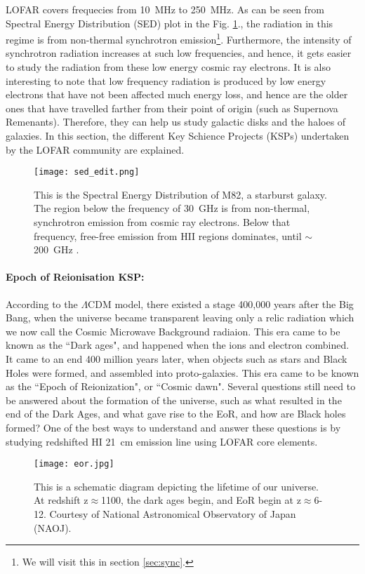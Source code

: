 \documentclass[../main/thesis_msc.tex]{subfiles}
\begin{document}
LOFAR covers frequecies from 10~MHz to 250~MHz. As can be seen from Spectral Energy Distribution (SED) plot in the Fig. \ref{sed}., the radiation in this regime is from non-thermal synchrotron emission\footnote{We will visit this in section \ref{sec:sync}.}. Furthermore, the intensity of synchrotron radiation increases at such low frequencies, and hence, it gets easier to study the radiation from these low energy cosmic ray electrons. It is also interesting to note that low frequency radiation is produced by low energy electrons that have not been affected much energy loss, and hence are the older ones that have travelled farther from their point of origin (such as Supernova Remenants). Therefore, they can help us study galactic disks and the haloes of galaxies. In this section, the different Key Schience Projects (KSPs) undertaken by the LOFAR community are explained.

\begin{figure}[h]
\centering
\texttt{[image: sed\_edit.png]}
\caption{This is the Spectral Energy Distribution of M82, a starburst galaxy. The region below the frequency of 30~GHz is from non-thermal, synchrotron emission from cosmic ray electrons. Below that frequency, free-free emission from HII regions dominates, until $\sim$200~GHz \citep{sed}.}
\label{sed}
\end{figure}

\paragraph{Epoch of Reionisation KSP:} According to the $\Lambda$CDM model, there existed a stage 400,000 years after the Big Bang, when the universe became transparent leaving only a relic radiation which we now call the Cosmic Microwave Background radiaion. This era came to be known as the ``Dark ages", and happened when the ions and electron combined. It came to an end 400 million years later, when objects such as stars and Black Holes were formed, and assembled into proto-galaxies. This era came to be known as the ``Epoch of Reionization", or ``Cosmic dawn". Several questions still need to be answered about the formation of the universe, such as what resulted in the end of the Dark Ages, and what gave rise to the EoR, and how are Black holes formed? One of the best ways to understand and answer these questions is by studying redshifted HI 21~cm emission line using LOFAR core elements.

\begin{figure}[h]
\centering
\texttt{[image: eor.jpg]}
\caption{This is a schematic diagram depicting the lifetime of our universe. At redshift z$\approx$1100, the dark ages begin, and EoR begin at z$\approx$6-12. Courtesy of National Astronomical Observatory of Japan (NAOJ).}
\end{figure}
\end{document}
